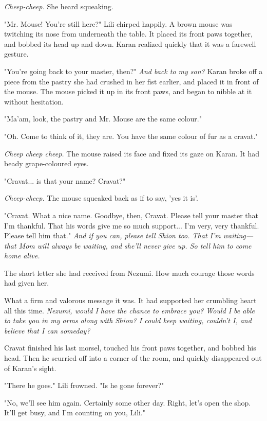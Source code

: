 \emph{Cheep-cheep.} She heard squeaking.

"Mr. Mouse! You're still here?" Lili chirped happily. A brown mouse was
twitching its nose from underneath the table. It placed its front paws
together, and bobbed its head up and down. Karan realized quickly that
it was a farewell gesture.

"You're going back to your master, then?" \emph{And back to my son?} Karan
broke off a piece from the pastry she had crushed in her fist earlier,
and placed it in front of the mouse. The mouse picked it up in its front
paws, and began to nibble at it without hesitation.

"Ma'am, look, the pastry and Mr. Mouse are the same colour."

"Oh. Come to think of it, they are. You have the same colour of fur as a
cravat."

\emph{Cheep cheep cheep.} The mouse raised its face and fixed its gaze on
Karan. It had beady grape-coloured eyes.

"Cravat... is that your name? Cravat?"

\emph{Cheep-cheep.} The mouse squeaked back as if to say, 'yes it is'.

"Cravat. What a nice name. Goodbye, then, Cravat. Please tell your
master that I'm thankful. That his words give me so much support... I'm
very, very thankful. Please tell him that." \emph{And if you can, please tell
Shion too. That I'm waiting---that Mom will always be waiting, and she'll
never give up. So tell him to come home alive.}


The short letter she had received from Nezumi. How much courage those
words had given her.


What a firm and valorous message it was. It had supported her crumbling
heart all this time. \emph{Nezumi, would I have the chance to embrace you?
Would I be able to take you in my arms along with Shion? I could keep
waiting, couldn't I, and believe that I can someday?}

Cravat finished his last morsel, touched his front paws together, and
bobbed his head. Then he scurried off into a corner of the room, and
quickly disappeared out of Karan's sight.

"There he goes." Lili frowned. "Is he gone forever?"

"No, we'll see him again. Certainly some other day. Right, let's open
the shop. It'll get busy, and I'm counting on you, Lili."

